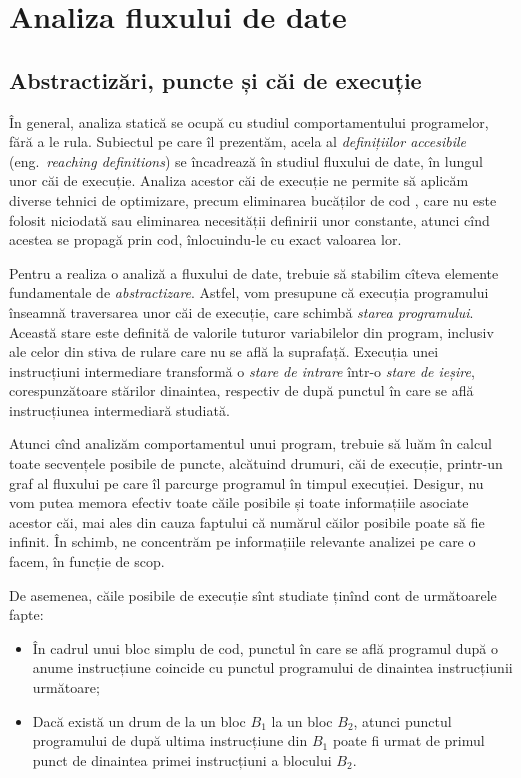 
\chapter{Analiza fluxului de date}
\label{ch:dataflow}

\section{Abstractizări, puncte și căi de execuție}
\label{sec:abstract}

În general, analiza statică se ocupă cu studiul comportamentului programelor,
fără a le rula. Subiectul pe care îl prezentăm, acela al \emph{definițiilor %
  accesibile} (eng.\ \textit{reaching definitions}) se încadrează în studiul
fluxului de date, în lungul unor căi de execuție. Analiza acestor căi de
execuție ne permite să aplicăm diverse tehnici de optimizare, precum
eliminarea bucăților de cod , care nu este folosit niciodată
sau eliminarea necesității definirii unor constante, atunci cînd acestea
se propagă prin cod, înlocuindu-le cu exact valoarea lor.

Pentru a realiza o analiză a fluxului de date, trebuie să stabilim cîteva
elemente fundamentale de \emph{abstractizare}. Astfel, vom presupune că
execuția programului în\-seam\-nă traversarea unor căi de execuție, care
schimbă \emph{starea programului}. Această stare este definită de valorile
tuturor variabilelor din program, inclusiv ale celor din stiva de rulare
care nu se află la suprafață. Execuția unei instrucțiuni intermediare
transformă o \emph{stare de intrare} într-o \emph{stare de ieșire},
corespunzătoare stărilor dinaintea, respectiv de după punctul în care
se află instrucțiunea intermediară studiată.

Atunci cînd analizăm comportamentul unui program, trebuie să luăm în
calcul toate sec\-ven\-țe\-le posibile de puncte, alcătuind drumuri, căi de
execuție, printr-un graf al fluxului pe care îl parcurge programul în
timpul execuției. Desigur, nu vom putea memora efectiv toate căile posibile
și toate informațiile asociate acestor căi, mai ales din cauza faptului
că numărul căilor posibile poate să fie infinit. În schimb, ne concentrăm
pe informațiile relevante analizei pe care o facem, în funcție de scop.

De asemenea, căile posibile de execuție sînt studiate ținînd cont de
următoarele fapte:
\begin{itemize}
\item În cadrul unui bloc simplu de cod, punctul în care se află programul
  după o anume instrucțiune coincide cu punctul programului de dinaintea
  instrucțiunii următoare;
\item Dacă există un drum de la un bloc $ B_1 $ la un bloc $ B_2 $, atunci
  punctul programului de după ultima instrucțiune din $ B_1 $ poate fi
  urmat de primul punct de dinaintea primei instrucțiuni a blocului $ B_2 $.
\end{itemize}


